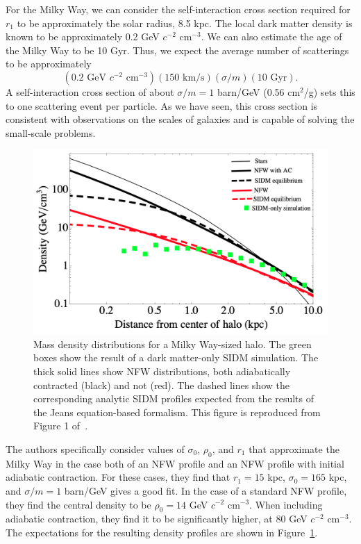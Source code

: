 For the Milky Way, we can consider the self-interaction cross section required
for $r_1$ to be approximately the solar radius, 8.5 kpc. The local dark matter
density is known to be approximately 0.2 GeV $c^{-2}$ cm$^{-3}$. We can also
estimate the age of the Milky Way to be 10 Gyr. Thus, we expect the average
number of scatterings to be approximately
\begin{equation}
    \left( 0.2 \text{ GeV $c^{-2}$ cm$^{-3}$} \right)
    \left( 150 \text{ km/s} \right)
    \left( \sigma/m \right)
    \left( 10 \text{ Gyr} \right).
\end{equation}
A self-interaction cross section of about $\sigma/m = 1$ barn/GeV (0.56
cm$^2$/g) sets this to one scattering event per particle. As we have seen, this
cross section is consistent with observations on the scales of galaxies and is
capable of solving the small-scale problems.

\begin{figure}
    \centering
    \includegraphics[width=0.65\linewidth]{figs/kaplinghat_sidm_density.png}
    \caption{%
        Mass density distributions for a Milky Way-sized halo. The green boxes
        show the result of a dark matter-only SIDM simulation. The thick solid
        lines show NFW distributions, both adiabatically contracted (black)
        and not (red). The dashed lines show the corresponding analytic SIDM
        profiles expected from the results of the Jeans equation-based
        formalism. This figure is reproduced from Figure 1
        of~\cite{kaplinghat_tying_2014}.
    }
    \label{fig:sidm_expected_density}
\end{figure}

The authors specifically consider values of $\sigma_0$, $\rho_0$, and $r_1$ that
approximate the Milky Way in the case both of an NFW profile and an NFW profile
with initial adiabatic contraction. For these cases, they find that $r_1 = 15$
kpc, $\sigma_0 = 165$ kpc, and $\sigma / m = 1$ barn/GeV gives a good fit. In
the case of a standard NFW profile, they find the central density to be $\rho_0
= 14$ GeV $c^{-2}$ cm$^{-3}$. When including adiabatic contraction, they find it
to be significantly higher, at 80 GeV $c^{-2}$ cm$^{-3}$. The expectations for
the resulting density profiles are shown in
Figure~\ref{fig:sidm_expected_density}.

